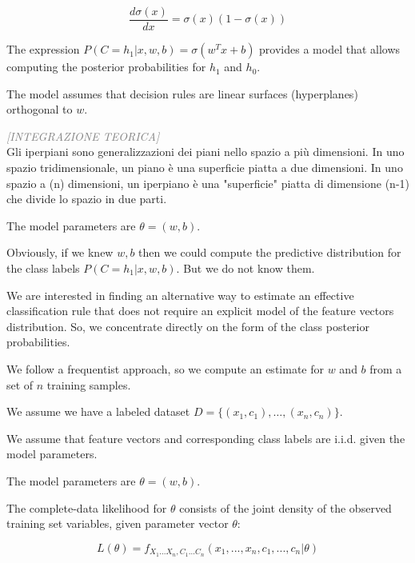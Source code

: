 \begin{equation*}
\frac{d\sigma(x)}{dx} = \sigma(x)(1-\sigma(x))
\end{equation*}

The expression $P(C = h_1 | x, w, b) = \sigma(w^T x + b)$ provides a model that allows computing the posterior probabilities for $h_1$ and $h_0$.

The model assumes that decision rules are linear surfaces (hyperplanes) orthogonal to $w$.

\begin{tcolorbox}[colframe=blue!70!black, colback=white, sharp corners=southwest, left=2mm, boxrule=1pt, enhanced, breakable]
\textcolor{gray}{\footnotesize\textit{[INTEGRAZIONE TEORICA]}}\\
Gli iperpiani sono generalizzazioni dei piani nello spazio a più dimensioni. In uno spazio tridimensionale, un piano è una superficie piatta a due dimensioni. In uno spazio a (n) dimensioni, un iperpiano è una "superficie" piatta di dimensione (n-1) che divide lo spazio in due parti.
\end{tcolorbox}

The model parameters are $\theta = (w, b)$.

Obviously, if we knew $w, b$ then we could compute the predictive distribution for the class labels $P(C = h_1 | x, w, b)$. But we do not know them.

We are interested in finding an alternative way to estimate an effective classification rule that does not require an explicit model of the feature vectors distribution. So, we concentrate directly on the form of the class posterior probabilities.

We follow a frequentist approach, so we compute an estimate for $w$ and $b$ from a set of $n$ training samples.

We assume we have a labeled dataset $D = \{(x_1, c_1), \ldots, (x_n, c_n)\}$.

We assume that feature vectors and corresponding class labels are i.i.d. given the model parameters.

The model parameters are $\theta = (w, b)$.

The complete-data likelihood for $\theta$ consists of the joint density of the observed training set variables, given parameter vector $\theta$:


\begin{equation*}
L(\theta) = f_{X_1...X_n, C_1...C_n}(x_1, ..., x_n, c_1, ..., c_n | \theta)
\end{equation*}

